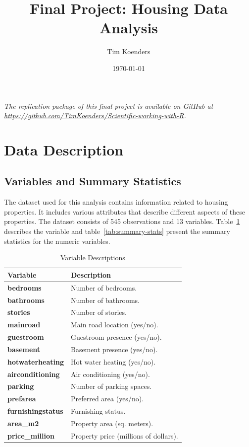 \documentclass[10pt]{article}
\title{Final Project: Housing Data Analysis}
\author{Tim Koenders}
\date{\today}
\begin{document}
\maketitle

\tableofcontents 
\listoftables
\listoffigures

\vspace{0.5cm}

\begin{tcolorbox}
\centering \itshape The replication package of this final project is available on GitHub at \href{https://github.com/TimKoenders/Scientific-working-with-R}{https://github.com/TimKoenders/Scientific-working-with-R}.
\end{tcolorbox}

\newpage

\section{Data Description}

\subsection{Variables and Summary Statistics}

The dataset used for this analysis contains information related to housing properties. It includes various attributes that describe different aspects of these properties. The dataset consists of 545 observations and 13 variables. Table~\ref{tab:variables} describes the variable and table~\ref{tab:summary-stats} present the summary statistics for the numeric variables.

\begin{table}[ht]
\centering
\begin{tabular}{@{}ll@{}}
\toprule
\textbf{Variable} & \textbf{Description} \\
\midrule
\textbf{bedrooms} & Number of bedrooms. \\
\textbf{bathrooms} & Number of bathrooms. \\
\textbf{stories} & Number of stories. \\
\textbf{mainroad} & Main road location (yes/no). \\
\textbf{guestroom} & Guestroom presence (yes/no). \\
\textbf{basement} & Basement presence (yes/no). \\
\textbf{hotwaterheating} & Hot water heating (yes/no). \\
\textbf{airconditioning} & Air conditioning (yes/no). \\
\textbf{parking} & Number of parking spaces. \\
\textbf{prefarea} & Preferred area (yes/no). \\
\textbf{furnishingstatus} & Furnishing status. \\
\textbf{area\_m2} & Property area (sq. meters). \\
\textbf{price\_million} & Property price (millions of dollars). \\
\bottomrule
\end{tabular}
\caption{Variable Descriptions}
\label{tab:variables}
\end{table}
\end{document}
